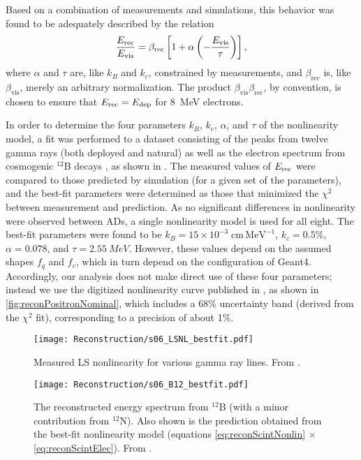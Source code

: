 \documentclass[../thesis.tex]{subfiles}
\begin{document}
Based on a combination of measurements and simulations, this behavior was found to be adequately described by the relation
\begin{equation}
  \frac{E_\mathrm{rec}}{E_\mathrm{vis}} = \beta_{\mathrm{rec}}\left[ 1 + \alpha \left( - \frac{E_\mathrm{vis}}{\tau} \right) \right],
  \label{eq:reconScintElec}
\end{equation}
where $\alpha$ and $\tau$ are, like $k_B$ and $k_c$, constrained by measurements, and $\beta_{\mathrm{rec}}$ is, like $\beta_{\mathrm{vis}}$, merely an arbitrary normalization. The product $\beta_{\mathrm{vis}}\beta_{\mathrm{rec}}$, by convention, is chosen to ensure that $E_\mathrm{rec} = E_\mathrm{dep}$ for 8~MeV electrons.

In order to determine the four parameters $k_B$, $k_c$, $\alpha$, and $\tau$ of the nonlinearity model, a fit was performed to a dataset consisting of the peaks from twelve gamma rays (both deployed and natural) as well as the electron spectrum from cosmogenic $^{12}$B decays \cite{NonlinearityPaper}, as shown in . The measured values of $E_\mathrm{rec}$ were compared to those predicted by simulation (for a given set of the parameters), and the best-fit parameters were determined as those that minimized the $\chi^2$ between measurement and prediction. As no significant differences in nonlinearity were observed between ADs, a single nonlinearity model is used for all eight. The best-fit parameters were found to be $k_B = 15 \times 10^{-3}\;\mathrm{cm\, MeV^{-1}}$, $k_c = 0.5\%$, $\alpha = 0.078$, and $\tau = \SI{2.55}{MeV}$. However, these values depend on the assumed shapes $f_q$ and $f_c$, which in turn depend on the configuration of Geant4. Accordingly, our analysis does not make direct use of these four parameters; instead we use the digitized nonlinearity curve published in \cite{NonlinearityPaper}, as shown in \autoref{fig:reconPositronNominal}, which includes a 68\% uncertainty band (derived from the $\chi^2$ fit), corresponding to a precision of about 1\%.

\begin{figure}[h]
  \texttt{[image: Reconstruction/s06\_LSNL\_bestfit.pdf]}
  \caption{Measured LS nonlinearity for various gamma ray lines. From \cite{NonlinearityPaper}.}
  \label{fig:reconGammaLines}
\end{figure}

\begin{figure}[h]
  \texttt{[image: Reconstruction/s06\_B12\_bestfit.pdf]}
  \caption{The reconstructed energy spectrum from $^{12}$B (with a minor contribution from $^{12}$N). Also shown is the prediction obtained from the best-fit nonlinearity model (equations \autoref{eq:reconScintNonlin} $\times$ \autoref{eq:reconScintElec}). From \cite{NonlinearityPaper}.}
  \label{fig:reconB12}
\end{figure}
\end{document}
